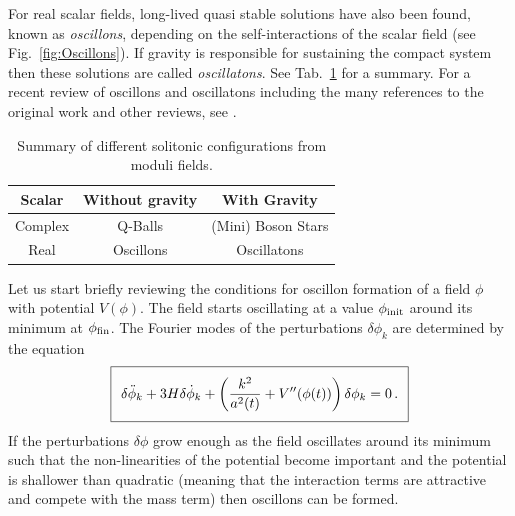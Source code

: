 For real scalar fields, long-lived quasi stable solutions have also been found, known as {\it oscillons}, depending on the self-interactions of the scalar field (see Fig.~\ref{fig:Oscillons}). If gravity is responsible for sustaining the compact system then these solutions are called {\it oscillatons}. See Tab.~\ref{tab:boson_stars} for a summary. For a recent review of oscillons and oscillatons including the many references to the original work and other reviews, see \cite{Visinelli:2021uve}.


\begin{table}
\begin{center}
\centering
\begin{tabular}{ | c | c | c |  }
\hline
\cellcolor[gray]{0.9}  {\bf Scalar} &  \cellcolor[gray]{0.9} {\bf Without gravity } &  \cellcolor[gray]{0.9} {\bf With Gravity}   \\
\hline \hline 
{Complex}   & Q-Balls  & (Mini) Boson Stars   \\
\hline
{Real}   & Oscillons  & Oscillatons  \\
\hline
\end{tabular}
\end{center} 
\caption {Summary of different solitonic configurations from moduli fields.}
\label{tab:boson_stars}
\end{table}


Let us start briefly reviewing the conditions for oscillon formation of a field $\phi$ with potential $V(\phi)$. The field starts oscillating  at a value $\phi_{\rm init}$ around its minimum at $\phi_{\rm fin}$. The Fourier modes of the perturbations $\delta\phi_k$ are determined by the equation
\begin{equation}
\setlength\fboxsep{0.25cm}
\setlength\fboxrule{0.4pt}
\boxed{
\delta{\ddot\phi_k}+3H\delta\dot\phi_k+\left(\frac{k^2}{a^2(t)}+V''(\phi(t)) \right) \delta\phi_k=0\,.
}
\end{equation}
If the perturbations $\delta\phi$ grow enough as the field oscillates around its minimum such that the non-linearities of the potential become important and the potential is shallower than quadratic (meaning that the interaction terms are attractive and compete with the mass term) then oscillons can be formed.

